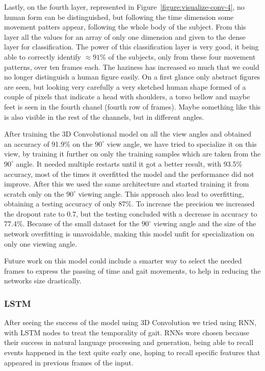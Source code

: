 \documentclass[12pt]{article}
\theoremstyle{definition}
\begin{document}
	Lastly, on the fourth layer, represented in Figure~\ref{figure:visualize-conv-4}, no human form can be distinguished, but following the time dimension some movement patters appear, following the whole body of the subject. From this layer all the values for an array of only one dimension and given to the dense layer for classification. The power of this classification layer is very good, it being able to correctly identify $\approx 91\%$ of the subjects, only from these four movement patterns, over ten frames each. The haziness has increased so much that we could no longer distinguish a human figure easily. On a first glance only abstract figures are seen, but looking very carefully a very sketched human shape formed of a couple of pixels that indicate a head with shoulders, a torso bellow and maybe feet is seen in the fourth chanel (fourth row of frames). Maybe something like this is also visible in the rest of the channels, but in different angles.

	After training the 3D Convolutional model on all the view angles and obtained an accuracy of 91.9\% on the $90^\circ$ view angle, we have tried to specialize it on this view, by training it further on only the training samples which are taken from the $90^\circ$ angle. It needed multiple restarts until it got a better result, with 93.5\% accuracy, most of the times it overfitted the model and the performance did not improve. After this we used the same architecture and started training it from scratch only on the $90^\circ$ viewing angle. This approach also lead to overfitting, obtaining a testing accuracy of only 87\%. To increase the precision we increased the dropout rate to 0.7, but the testing concluded with a decrease in accuracy to 77.4\%. Because of the small dataset for the $90^\circ$ viewing angle and the size of the network overfitting is unavoidable, making this model unfit for specialization on only one viewing angle.

	Future work on this model could include a smarter way to select the needed frames to express the passing of time and gait movements, to help in reducing the networks size drastically.

	\subsubsection{LSTM}

	After seeing the success of the model using 3D Convolution we tried using RNN, with LSTM nodes to treat the temporality of gait. RNNs wore chosen because their success in natural language processing and generation, being able to recall events happened in the text quite early one, hoping to recall specific features that appeared in previous frames of the input.
\end{document}

